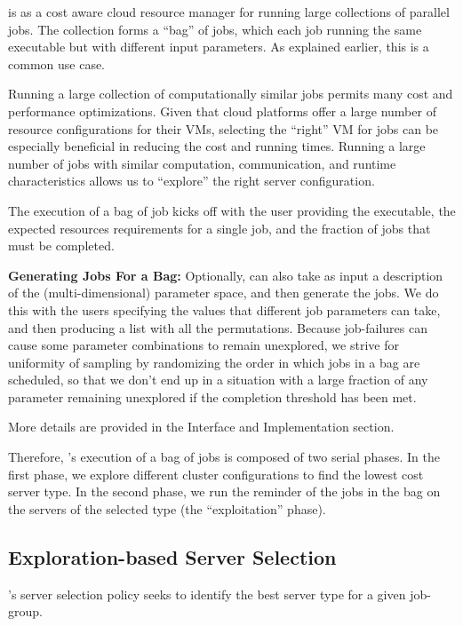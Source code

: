 \sysname is as a cost aware cloud resource manager for running large collections of parallel jobs.
The collection forms a ``bag'' of jobs, which each job running the same executable but with different input parameters.
As explained earlier, this is a common use case.

Running a large collection of computationally similar jobs permits many cost and performance optimizations.
Given that cloud platforms offer a large number of resource configurations for their VMs, selecting the ``right'' VM for jobs can be especially beneficial in reducing the cost and running times.
Running a large number of jobs with similar computation, communication, and runtime characteristics allows us to ``explore'' the right server configuration.


The execution of a bag of job kicks off with the user providing the executable, the expected resources requirements for a single job, and the fraction of jobs that must be completed.

\textbf{Generating Jobs For a Bag:} Optionally, \sysname can also take as input a description of the (multi-dimensional) parameter space, and then generate the jobs.
We do this with the users specifying the values that different job parameters can take, and then producing a list with all the permutations.
Because job-failures can cause some parameter combinations to remain unexplored, we strive for uniformity of sampling by randomizing the order in which jobs in a bag are scheduled, so that we don't end up in a situation with a large fraction of any parameter remaining unexplored if the completion threshold has been met.


More details are provided in the Interface and Implementation section.


Therefore, \sysname's execution of a bag of jobs is composed of two serial phases.
In the first phase, we explore different cluster configurations to find the lowest cost server type.
In the second phase, we run the reminder of the jobs in the bag on the servers of the selected type (the ``exploitation'' phase).



\subsection{Exploration-based Server Selection}

\sysname's server selection policy seeks to identify the best server type for a given job-group.

